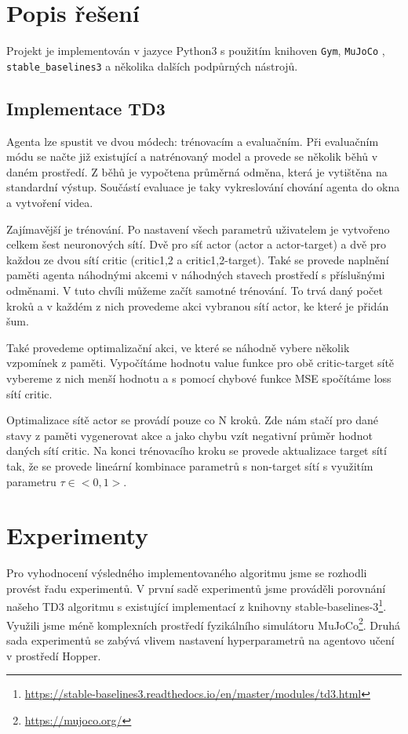 \section{Popis řešení}
\label{sec:IMplementation}
Projekt je implementován v jazyce Python3 s použitím knihoven \texttt{Gym}, \texttt{MuJoCo} \cite{todorov2012mujoco},\\\texttt{stable\_baselines3} a několika dalších podpůrných nástrojů.

\subsection{Implementace TD3}
Agenta lze spustit ve dvou módech: trénovacím a evaluačním. Při evaluačním módu se načte již existující a natrénovaný model a provede se několik běhů v daném prostředí. Z běhů je vypočtena průměrná odměna, která je vytištěna na standardní výstup. Součástí evaluace je taky vykreslování chování agenta do okna a vytvoření videa.

Zajímavější je trénování. Po nastavení všech parametrů uživatelem je vytvořeno celkem šest neuronových sítí. Dvě pro síť actor (actor a actor-target) a dvě pro každou ze dvou sítí critic (critic1,2 a critic1,2-target). Také se provede naplnění paměti agenta náhodnými akcemi v náhodných stavech prostředí s příslušnými odměnami. V tuto chvíli můžeme začít samotné trénování. To trvá daný počet kroků a v každém z nich provedeme akci vybranou sítí actor, ke které je přidán šum.

Také provedeme optimalizační akci, ve které se náhodně vybere několik vzpomínek z paměti. Vypočítáme hodnotu value funkce pro obě critic-target sítě vybereme z nich menší hodnotu a s pomocí chybové funkce MSE spočítáme loss sítí critic.

Optimalizace sítě actor se provádí pouze co N kroků. Zde nám stačí pro dané stavy z paměti vygenerovat akce a jako chybu vzít negativní průměr hodnot daných sítí critic. Na konci trénovacího kroku se provede aktualizace target sítí tak, že se provede lineární kombinace parametrů s non-target sítí s využitím parametru $\tau \in <0, 1>$. 


\section{Experimenty}
Pro vyhodnocení výsledného implementovaného algoritmu jsme se rozhodli provést řadu experimentů. V první sadě experimentů jsme prováděli porovnání našeho TD3 algoritmu s existující implementací z knihovny stable-baselines-3\footnote{\url{https://stable-baselines3.readthedocs.io/en/master/modules/td3.html}}. Využili jsme méně komplexních prostředí fyzikálního simulátoru MuJoCo\footnote{\url{https://mujoco.org/}}. Druhá sada experimentů se zabývá vlivem nastavení hyperparametrů na agentovo učení v prostředí Hopper.


